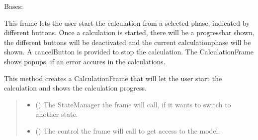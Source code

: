 \documentclass[letterpaper,10pt,english]{sphinxmanual}
\begin{document}
\begin{fulllineitems}
\label{\detokenize{apidoc/src.osm_configurator.view.toplevelframes:src.osm_configurator.view.toplevelframes.calculation_frame.CalculationFrame}}
\pysigstartsignatures
{}
\pysigstopsignatures
\sphinxAtStartPar
Bases: {\hyperref[\detokenize{apidoc/src.osm_configurator.view.toplevelframes:src.osm_configurator.view.toplevelframes.top_level_frame.TopLevelFrame}]{}}

\sphinxAtStartPar
This frame lets the user start the calculation from a selected phase, indicated by different buttons.
Once a calculation is started, there will be a progressbar shown, the different buttons will be deactivated
and the current calculation\sphinxhyphen{}phase will be shown.
A cancel\sphinxhyphen{}Button is provided to stop the calculation.
The CalculationFrame shows popups, if an error accures in the calculations.

\begin{fulllineitems}
\label{\detokenize{apidoc/src.osm_configurator.view.toplevelframes:src.osm_configurator.view.toplevelframes.calculation_frame.CalculationFrame.__init__}}
\pysigstartsignatures
{}
\pysigstopsignatures
\sphinxAtStartPar
This method creates a CalculationFrame that will let the user start the calculation
and shows the calculation progress.
\begin{quote}\begin{description}
\begin{itemize}
\item {} 
\sphinxAtStartPar
{} ({\hyperref[\detokenize{apidoc/src.osm_configurator.view.states:src.osm_configurator.view.states.state_manager.StateManager}]{}}) \textendash{} The StateManager the frame will call, if it wants to switch to another state.

\item {} 
\sphinxAtStartPar
{} ({\hyperref[\detokenize{apidoc/src.osm_configurator.control:src.osm_configurator.control.control_interface.IControl}]{}}) \textendash{} The control the frame will call to get access to the model.


\end{itemize}
\end{description}
\end{quote}
\end{fulllineitems}
\end{fulllineitems}
\end{document}

